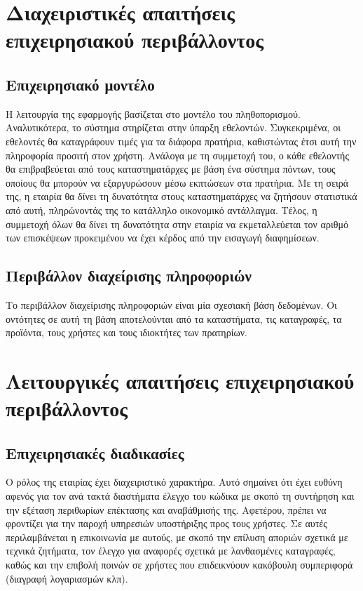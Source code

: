 \documentclass[a4paper,oneside, 12pt]{article}
\begin{document}
\section{Διαχειριστικές απαιτήσεις επιχειρησιακού περιβάλλοντος}
\subsection{Επιχειρησιακό μοντέλο}
Η λειτουργία της εφαρμογής βασίζεται στο μοντέλο του πληθοπορισμού.
Αναλυτικότερα, το σύστημα στηρίζεται στην ύπαρξη εθελοντών. Συγκεκριμένα,
οι εθελοντές θα καταγράφουν τιμές για τα διάφορα πρατήρια, καθιστώντας έτσι
αυτή την πληροφορία προσιτή στον χρήστη. Ανάλογα με τη συμμετοχή του, ο
κάθε εθελοντής θα επιβραβεύεται από τους καταστηματάρχες με βάση ένα
σύστημα πόντων, τους οποίους θα μπορούν να εξαργυρώσουν μέσω εκπτώσεων
στα πρατήρια. Με τη σειρά της, η εταιρία θα δίνει τη δυνατότητα στους
καταστηματάρχες να ζητήσουν στατιστικά από αυτή, πληρώνοντάς της το
κατάλληλο οικονομικό αντάλλαγμα. Τέλος, η συμμετοχή όλων θα δίνει τη
δυνατότητα στην εταιρία να εκμεταλλεύεται τον αριθμό των επισκέψεων
προκειμένου να έχει κέρδος από την εισαγωγή διαφημίσεων.

\subsection{Περιβάλλον διαχείρισης πληροφοριών}

Το περιβάλλον διαχείρισης πληροφοριών είναι μία σχεσιακή βάση δεδομένων. Οι
οντότητες σε αυτή τη βάση αποτελούνται από τα καταστήματα, τις
καταγραφές, τα προϊόντα, τους χρήστες και τους ιδιοκτήτες των πρατηρίων.

\section{Λειτουργικές απαιτήσεις επιχειρησιακού περιβάλλοντος}
\subsection{Επιχειρησιακές διαδικασίες}
Ο ρόλος της εταιρίας έχει διαχειριστικό χαρακτήρα. Αυτό σημαίνει ότι έχει
ευθύνη αφενός για τον ανά τακτά διαστήματα έλεγχο του κώδικα με σκοπό τη
συντήρηση και την εξέταση περιθωρίων επέκτασης και αναβάθμισής της.
Αφετέρου, πρέπει να φροντίζει για την παροχή υπηρεσιών υποστήριξης προς
τους χρήστες. Σε αυτές περιλαμβάνεται η επικοινωνία με αυτούς, με σκοπό την
επίλυση αποριών σχετικά με τεχνικά ζητήματα, τον έλεγχο για αναφορές
σχετικά με λανθασμένες καταγραφές, καθώς και την επιβολή ποινών σε χρήστες
που επιδεικνύουν κακόβουλη συμπεριφορά (διαγραφή λογαριασμών κλπ).
\end{document}
